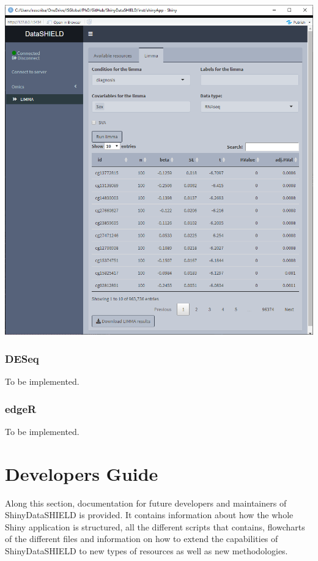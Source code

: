 \documentclass[
]{book}
\begin{document}
\includegraphics{images/omics1.png}

\hypertarget{deseq}{%
\subsection{DESeq}\label{deseq}}

To be implemented.

\hypertarget{edger}{%
\subsection{edgeR}\label{edger}}

To be implemented.

\hypertarget{developers-guide}{%
\chapter{Developers Guide}\label{developers-guide}}

Along this section, documentation for future developers and maintainers of ShinyDataSHIELD is provided. It contains information about how the whole Shiny application is structured, all the different scripts that contains, flowcharts of the different files and information on how to extend the capabilities of ShinyDataSHIELD to new types of resources as well as new methodologies.
\end{document}
